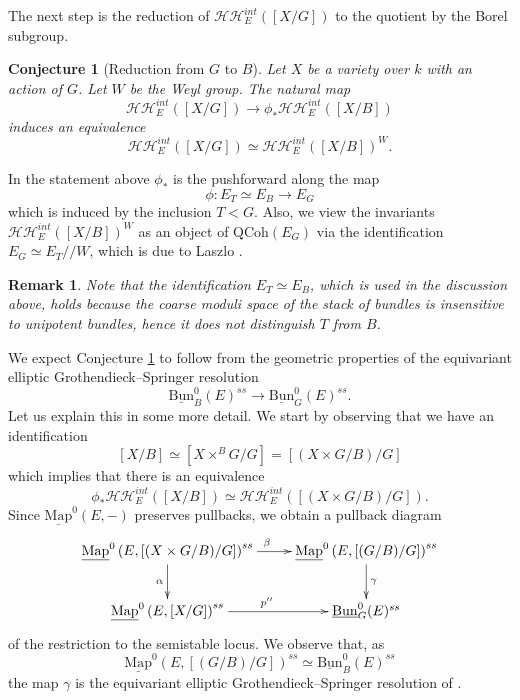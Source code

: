 \documentclass[11pt,letterpaper]{amsart}
\newtheorem{conjecture}[dummy]{Conjecture}
\newtheorem{remark}[dummy]{Remark}
\newcommand{\cHH}{\mathcal{HH}}
\newcommand{\Mapo}[2]{\underline{\mathrm{Map}}^{0}\left (#1,#2\right )}
\newcommand{\Bun}{\underline{\mathrm{Bun}}}
\newcommand{\QCoh}{\mathrm{QCoh}}
\begin{document}
The next step is the reduction of $\cHH_E^{int}([X/G])$ to the quotient by the Borel subgroup. 
\begin{conjecture}[Reduction from $G$ to $B$]\label{conjecture:HHEG}
Let $X$ be a variety over $k$ with an action of $G$. Let $W$ be the Weyl group. The natural map
$$\cHH_E^{int}([X/G])\to\phi_\ast\cHH_E^{int}([X/B])$$
induces an equivalence
$$\cHH_E^{int}([X/G])\simeq\cHH_E^{int}([X/B])^W.$$
\end{conjecture}
In the statement above $\phi_*$ is the pushforward  along the map
$$\phi:E_T\simeq E_B\to E_G$$
 which is induced by the inclusion $T < G$. Also, we view the invariants $\cHH_E^{int}([X/B])^W$ as an object of $\QCoh(E_G)$ via the identification  
$E_G\simeq E_T//W$, which is  
due to Laszlo \cite{Laszlo}. 
\begin{remark}\label{remark:Intrinsic_T}
Note that the identification $E_T\simeq E_B$, which is used in the discussion above, holds because the coarse moduli space of the stack of bundles is insensitive to unipotent bundles, hence it  does not distinguish $T$ from $B$.
\end{remark}
We expect Conjecture \ref{conjecture:HHEG} to follow from the geometric properties of the equivariant elliptic Grothendieck--Springer resolution
$$\Bun_{B}^{0}(E)^{ss}\to\Bun_{G}^{0}(E)^{ss}.$$ Let us explain this in some more detail. We start by observing that we have an identification 
$$[X/B]\simeq [X\times^{B}G/G]=[(X\times G/B)/G]$$
which implies that there is an equivalence
$$\phi_\ast\cHH_E^{int}([X/B])\simeq\cHH_E^{int}([(X\times G/B)/G]).$$ 
Since $\Mapo{E}{-}$ preserves pullbacks, we obtain a pullback diagram
$$\xymatrix{
\Mapo{E}{[(X\times G/B)/G]}^{ss}\ar[r]^{\beta} \ar[d]_{\alpha}  & \Mapo{E}{[(G/B)/G]}^{ss} \ar[d]^{\gamma} \\
\Mapo{E}{[X/G]}^{ss} \ar[r]^{p''} & \Bun^{0}_G(E)^{ss}
}
$$
of the restriction to the semistable locus. We observe that, as 
$$\Mapo{E}{[(G/B)/G]}^{ss} \simeq \Bun_B^{0}(E)^{ss}$$
the map $\gamma$ is the equivariant elliptic Grothendieck--Springer resolution of \cite{BZNEllipticGS}. 
\end{document}
